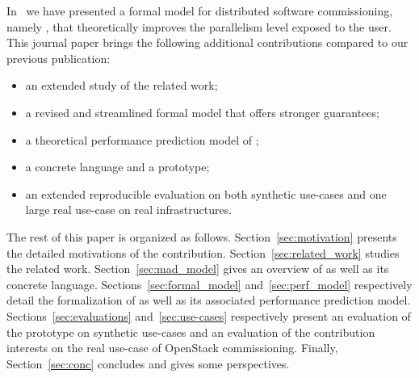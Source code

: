 In~\cite{chardet:hal-01858150} we have presented a formal model for distributed software commissioning, namely \mad, that theoretically improves the parallelism
level exposed to the user. This journal paper brings the following additional
contributions compared to our previous publication: 
\begin{itemize} 
	\item an extended study of the related work; 
	\item a revised and streamlined \mad formal	model that offers stronger guarantees; 
	\item a theoretical performance prediction model of \mad; 
	\item a concrete language and a prototype;
	\item an extended reproducible evaluation on both synthetic use-cases and one large real use-case on real infrastructures.
\end{itemize}

The rest of this paper is organized as follows. Section~\ref{sec:motivation} presents the detailed motivations of the contribution. Section~\ref{sec:related_work} studies the related work. Section~\ref{sec:mad_model} gives an overview of \mad as well as its concrete language. Sections~\ref{sec:formal_model} and~\ref{sec:perf_model} respectively detail the formalization of \mad as well as its associated performance prediction model. Sections~\ref{sec:evaluations} and~\ref{sec:use-cases} respectively present an evaluation of the \mad prototype on synthetic use-cases and an evaluation of the contribution interests on the real use-case of OpenStack commissioning.  Finally, Section~\ref{sec:conc} concludes and gives some perspectives.




